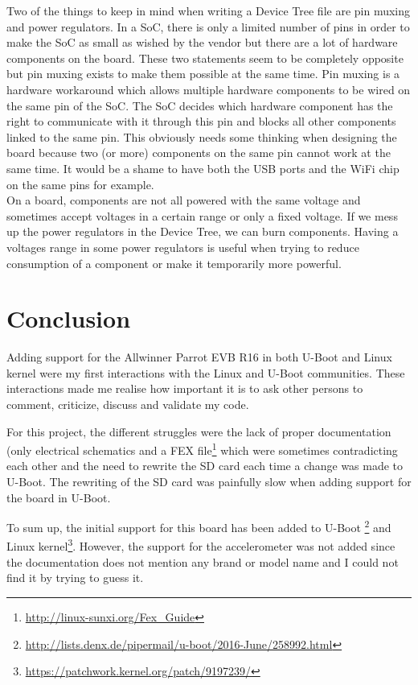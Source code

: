 Two of the things to keep in mind when writing a Device Tree file are pin muxing and power regulators. In a SoC, there is only a limited number of pins in order to make the SoC as small as wished by the vendor but there are a lot of hardware components on the board. These two statements seem to be completely opposite but pin muxing exists to make them possible at the same time. Pin muxing is a hardware workaround which allows multiple hardware components to be wired on the same pin of the SoC. The SoC decides which hardware component has the right to communicate with it through this pin and blocks all other components linked to the same pin. This obviously needs some thinking when designing the board because two (or more) components on the same pin cannot work at the same time. It would be a shame to have both the USB ports and the WiFi chip on the same pins for example.\\
On a board, components are not all powered with the same voltage and sometimes accept voltages in a certain range or only a fixed voltage. If we mess up the power regulators in the Device Tree, we can burn components. Having a voltages range in some power regulators is useful when trying to reduce consumption of a component or make it temporarily more powerful.

\section{Conclusion}

Adding support for the Allwinner Parrot EVB R16 in both U-Boot and Linux kernel were my first interactions with the Linux and U-Boot communities. These interactions made me realise how important it is to ask other persons to comment, criticize, discuss and validate my code.

For this project, the different struggles were the lack of proper documentation (only electrical schematics and a FEX file\footnote{\url{http://linux-sunxi.org/Fex\_Guide}} which were sometimes contradicting each other and the need to rewrite the SD card each time a change was made to U-Boot. The rewriting of the SD card was painfully slow when adding support for the board in U-Boot.

To sum up, the initial support for this board has been added to U-Boot \footnote{\url{http://lists.denx.de/pipermail/u-boot/2016-June/258992.html}} and Linux kernel\footnote{\url{https://patchwork.kernel.org/patch/9197239/}}. However, the support for the accelerometer was not added since the documentation does not mention any brand or model name and I could not find it by trying to guess it.
